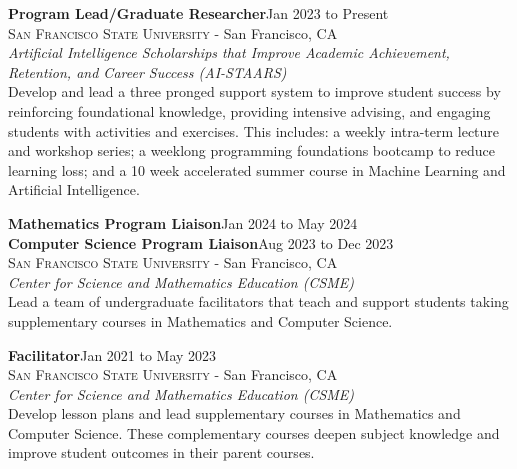 \documentclass[hidelinks, 10.5pt]{article}
\def\contentwidth{0.9\linewidth}    %
\def\contentblockspacing{2.5mm}     %
\def\contentheaderspacing{1mm}      %
\begin{document}
{\begin{minipage}[ct]{\contentwidth}
    \textbf{Program Lead/Graduate Researcher}\hfill Jan 2023 to Present\\
    {\textsc{San Francisco State University} - San Francisco, CA}\\
    \textit{Artificial Intelligence Scholarships that Improve Academic Achievement, Retention, and Career Success (AI-STAARS)}
    \vspace{\contentheaderspacing}\\
    Develop and lead a three pronged support system to improve student success by reinforcing foundational knowledge, providing intensive
    advising, and engaging students with activities and exercises. This includes: a weekly intra-term lecture and workshop series; a weeklong
    programming foundations bootcamp to reduce learning loss; and a 10 week accelerated summer course in Machine Learning and
    Artificial Intelligence.
\end{minipage}

\vspace{\contentblockspacing}

\begin{minipage}[ct]{\contentwidth}
    \textbf{Mathematics Program Liaison}\hfill Jan 2024 to May 2024\\
    \textbf{Computer Science Program Liaison}\hfill Aug 2023 to Dec 2023\\
    {\textsc{San Francisco State University} - San Francisco, CA}\\
    \textit{Center for Science and Mathematics Education (CSME)}
    \vspace{\contentheaderspacing}\\
    Lead a team of undergraduate facilitators that teach and support students taking supplementary courses in Mathematics and Computer
    Science.
\end{minipage}

\vspace{\contentblockspacing}

\begin{minipage}[ct]{\contentwidth}
    \textbf{Facilitator}\hfill Jan 2021 to May 2023\\
    {\textsc{San Francisco State University} - San Francisco, CA}\\
    \textit{Center for Science and Mathematics Education (CSME)}
    \vspace{\contentheaderspacing}\\
    Develop lesson plans and lead supplementary courses in Mathematics and Computer Science.  These complementary courses deepen subject
    knowledge and improve student outcomes in their parent courses.
\end{minipage}

}
\end{document}
